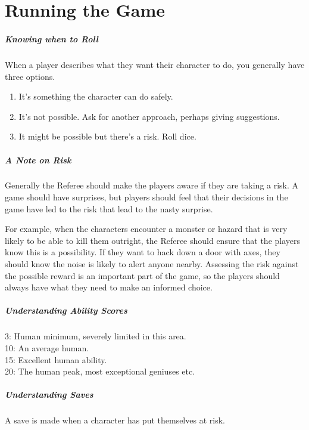 \documentclass[itdr]{subfiles}
\begin{document}
\chapter{Running the Game}

\paragraph{Knowing when to Roll}
When a player describes what they want their character to do, you generally
have three options.
\begin{enumerate}
	\item It's something the character can do safely.
	\item It's not possible. Ask for another approach, perhaps giving suggestions.
	\item It might be possible but there's a risk. Roll dice.
\end{enumerate}

\paragraph{A Note on Risk}
Generally the Referee should make the players aware if they are taking a risk. A game should have surprises, but players should feel that their decisions in the game have led to the risk that lead to the nasty surprise.

For example, when the characters encounter a monster or hazard that is very likely to be able to kill them outright, the Referee should ensure that the players know this is a possibility. If they want to hack down a door with axes, they should know the noise is likely to alert anyone nearby. Assessing the risk against the possible reward is an important part of the game, so the players should always have what they need to make an informed choice.

\paragraph{Understanding Ability Scores}
3: Human minimum, severely limited in this area.\\
10: An average human.\\
15: Excellent human ability.\\
20: The human peak, most exceptional geniuses etc.\\

\paragraph{Understanding Saves}
A save is made  when a character has put themselves at risk.
\end{document}
